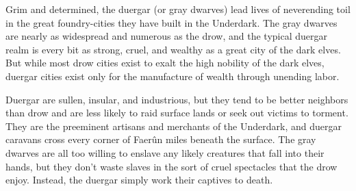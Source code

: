 
Grim and determined, the duergar (or gray dwarves) lead lives of neverending toil in the great foundry-cities they have built in the Underdark. The gray dwarves are nearly as widespread and numerous as the drow, and the typical duergar realm is every bit as strong, cruel, and wealthy as a great city of the dark elves. But while most drow cities exist to exalt the high nobility of the dark elves, duergar cities exist only for the manufacture of wealth through unending labor.

Duergar are sullen, insular, and industrious, but they tend to be better neighbors than drow and are less likely to raid surface lands or seek out victims to torment. They are the preeminent artisans and merchants of the Underdark, and duergar caravans cross every corner of Faerûn miles beneath the surface. The gray dwarves are all too willing to enslave any likely creatures that fall into their hands, but they don’t waste slaves in the sort of cruel spectacles that the drow enjoy. Instead, the duergar simply work their captives to death.

